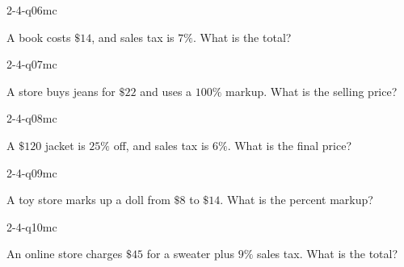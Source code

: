 \begin{practiceQuestion}{2-4-q06}{mc}
\begin{questionText}
A book costs $\$14$, and sales tax is $7\%$. What is the total?
\end{questionText}
\end{practiceQuestion}

\begin{practiceQuestion}{2-4-q07}{mc}
\begin{questionText}
A store buys jeans for $\$22$ and uses a $100\%$ markup. What is the selling price?
\end{questionText}
\end{practiceQuestion}

\begin{practiceQuestion}{2-4-q08}{mc}
\begin{questionText}
A $\$120$ jacket is $25\%$ off, and sales tax is $6\%$. What is the final price?
\end{questionText}
\end{practiceQuestion}

\begin{practiceQuestion}{2-4-q09}{mc}
\begin{questionText}
A toy store marks up a doll from $\$8$ to $\$14$. What is the percent markup?
\end{questionText}
\end{practiceQuestion}

\begin{practiceQuestion}{2-4-q10}{mc}
\begin{questionText}
An online store charges $\$45$ for a sweater plus $9\%$ sales tax. What is the total?
\end{questionText}
\end{practiceQuestion}

